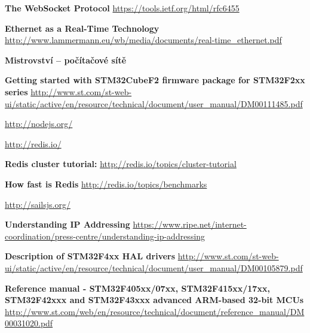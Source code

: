 \documentclass[oneside,12pt,a4paper,draft]{book} %
\begin{document}
\begin{thebibliography}{99}
 {\bf The WebSocket Protocol} \url{https://tools.ietf.org/html/rfc6455}

 {\bf Ethernet as a Real-Time Technology} \url{http://www.lammermann.eu/wb/media/documents/real-time_ethernet.pdf}

 {\bf Mistrovství – počítačové sítě}

 {\bf Getting started with STM32CubeF2 firmware package for STM32F2xx series} \url{http://www.st.com/st-web-ui/static/active/en/resource/technical/document/user_manual/DM00111485.pdf}

 \url{http://nodejs.org/}

 \url{http://redis.io/}

 {\bf Redis cluster tutorial:} \url{http://redis.io/topics/cluster-tutorial}

 {\bf How fast is Redis} \url{http://redis.io/topics/benchmarks}

 \url{http://sailsjs.org/}

 {\bf Understanding IP Addressing} \url{https://www.ripe.net/internet-coordination/press-centre/understanding-ip-addressing}

 {\bf Description of STM32F4xx HAL drivers} \url{http://www.st.com/st-web-ui/static/active/en/resource/technical/document/user_manual/DM00105879.pdf}

 {\bf Reference manual - STM32F405xx/07xx, STM32F415xx/17xx, STM32F42xxx and
STM32F43xxx advanced ARM\textregistered-based 32-bit MCUs} \url{http://www.st.com/web/en/resource/technical/document/reference_manual/DM00031020.pdf}
\end{thebibliography}
\end{document}
